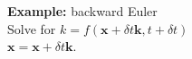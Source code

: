 \documentclass[a4paper,12pt]{article}
\begin{document}
\textbf{Example:} backward Euler\\
\indent Solve for $k = f(\mathbf{x} + \delta t\mathbf{k}, t + \delta t)$ \\
\indent $\mathbf{x} =  \mathbf{x} + \delta t \mathbf{k}$.

%
%
\end{document}
